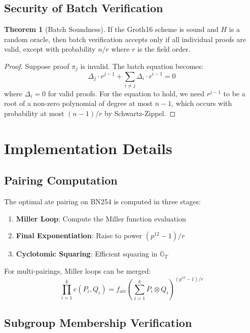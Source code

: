 \documentclass[11pt,a4paper]{article}
\theoremstyle{definition}
\newtheorem{theorem}{Theorem}
\begin{document}
\subsection{Security of Batch Verification}

\begin{theorem}[Batch Soundness]
    If the Groth16 scheme is sound and $H$ is a random oracle, then batch verification accepts only if all individual proofs are valid, except with probability $n/r$ where $r$ is the field order.
\end{theorem}

\begin{proof}
    Suppose proof $\pi_j$ is invalid. The batch equation becomes:
    \[
    \Delta_j \cdot r^{j-1} + \sum_{i \neq j} \Delta_i \cdot r^{i-1} = 0
    \]
    where $\Delta_i = 0$ for valid proofs. For the equation to hold, we need $r^{j-1}$ to be a root of a non-zero polynomial of degree at most $n-1$, which occurs with probability at most $(n-1)/r$ by Schwartz-Zippel.
\end{proof}

\section{Implementation Details}

\subsection{Pairing Computation}

The optimal ate pairing on BN254 is computed in three stages:

\begin{enumerate}
    \item \textbf{Miller Loop}: Compute the Miller function evaluation
    \item \textbf{Final Exponentiation}: Raise to power $(p^{12} - 1)/r$
    \item \textbf{Cyclotomic Squaring}: Efficient squaring in $\mathbb{G}_T$
\end{enumerate}

For multi-pairings, Miller loops can be merged:
\begin{equation}
\prod_{i=1}^{k} e(P_i, Q_i) = f_{ate}\left(\sum_{i=1}^{k} P_i \otimes Q_i\right)^{(p^{12}-1)/r}
\end{equation}

\subsection{Subgroup Membership Verification}
\end{document}
